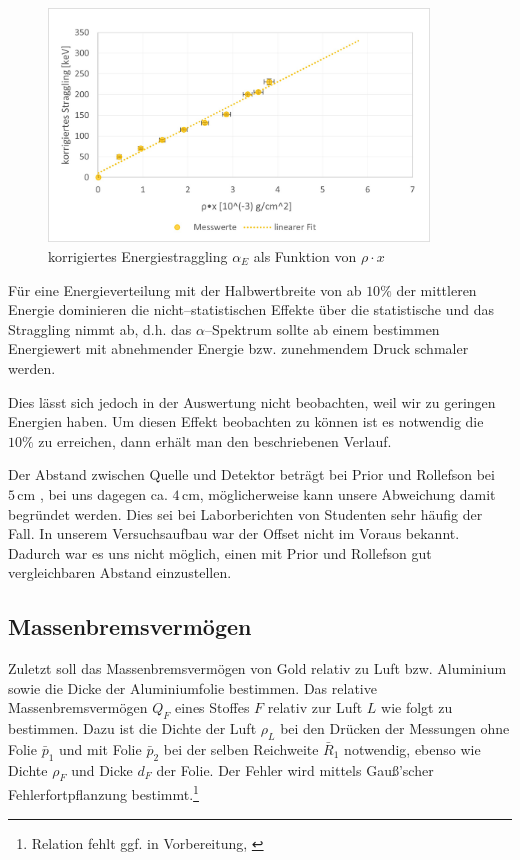 \documentclass[12pt,a4paper]{scrartcl}
\numberwithin{equation}{section} %
\begin{document}
\begin{figure}[h]
	\centering
	\includegraphics[width=0.9\textwidth]{../media/B3.3/Straggling corrected.jpg}
	\caption{korrigiertes Energiestraggling $\alpha _E$ als Funktion von $\rho \cdot x$}
	\label{abb:korr. Straggling}
\end{figure}

Für eine Energieverteilung mit der Halbwertbreite von ab $10\%$ der mittleren Energie dominieren die nicht--statistischen Effekte über die statistische und das Straggling nimmt ab, d.h. das $\alpha$--Spektrum sollte ab einem bestimmen Energiewert mit abnehmender Energie bzw. zunehmendem Druck schmaler werden.

Dies lässt sich jedoch in der Auswertung nicht beobachten, weil wir zu geringen Energien haben. Um diesen Effekt beobachten zu können ist es notwendig die $10\%$ zu erreichen, dann erhält man den beschriebenen Verlauf.

Der Abstand zwischen Quelle und Detektor beträgt bei Prior und Rollefson bei $5\mathrm{\,cm}$  \cite{Prior}, bei uns dagegen ca. $4\mathrm{\,cm}$, möglicherweise kann unsere Abweichung damit begründet werden. Dies sei bei Laborberichten von Studenten sehr häufig der Fall. \cite{Prior} In unserem Versuchsaufbau war der Offset nicht im Voraus bekannt. Dadurch war es uns nicht möglich, einen mit Prior und Rollefson gut vergleichbaren Abstand einzustellen.

\hypertarget{massenbremsvermuxf6gen}{%
\subsection{Massenbremsvermögen}\label{massenbremsvermuxf6gen}}

Zuletzt soll das Massenbremsvermögen von Gold relativ zu Luft bzw. Aluminium sowie die Dicke der Aluminiumfolie bestimmen. Das relative Massenbremsvermögen $Q_F$ eines Stoffes $F$ relativ zur Luft $L$ wie folgt zu bestimmen. Dazu ist die Dichte der Luft $\rho_L$ bei den Drücken der Messungen ohne Folie $\bar p_1$ und mit Folie $\bar p_2$ bei der selben Reichweite $\bar R_1$ notwendig, ebenso wie Dichte $\rho_F$ und Dicke $d_F$ der Folie. Der Fehler wird mittels Gauß'scher Fehlerfortpflanzung bestimmt.\footnote{Relation fehlt ggf. in Vorbereitung, \cite[p. 5]{Uni}}
\end{document}
